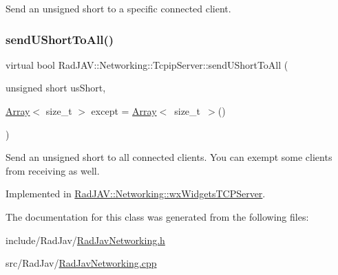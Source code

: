 Send an unsigned short to a specific connected client. \mbox{\label{class_rad_j_a_v_1_1_networking_1_1_tcpip_server_afa2c3dc49d91e9205d6b814266fa8d0e}} 
\subsubsection{\texorpdfstring{send\+U\+Short\+To\+All()}{sendUShortToAll()}}
{\footnotesize\ttfamily virtual bool Rad\+J\+A\+V\+::\+Networking\+::\+Tcpip\+Server\+::send\+U\+Short\+To\+All (\begin{DoxyParamCaption}\item[{unsigned short}]{us\+Short,  }\item[{\mbox{\hyperlink{class_rad_j_a_v_1_1_array}{Array}}$<$ size\+\_\+t $>$}]{except = {\ttfamily \mbox{\hyperlink{class_rad_j_a_v_1_1_array}{Array}}$<$~size\+\_\+t~$>$()} }\end{DoxyParamCaption})\hspace{0.3cm}{\ttfamily [pure virtual]}}

Send an unsigned short to all connected clients. You can exempt some clients from receiving as well. 

Implemented in \mbox{\hyperlink{class_rad_j_a_v_1_1_networking_1_1wx_widgets_t_c_p_server_a8b5f3d3a55504d84a69fa765c11d737f}{Rad\+J\+A\+V\+::\+Networking\+::wx\+Widgets\+T\+C\+P\+Server}}.



The documentation for this class was generated from the following files\+:\begin{DoxyCompactItemize}
\item 
include/\+Rad\+Jav/\mbox{\hyperlink{_rad_jav_networking_8h}{Rad\+Jav\+Networking.\+h}}\item 
src/\+Rad\+Jav/\mbox{\hyperlink{_rad_jav_networking_8cpp}{Rad\+Jav\+Networking.\+cpp}}\end{DoxyCompactItemize}
